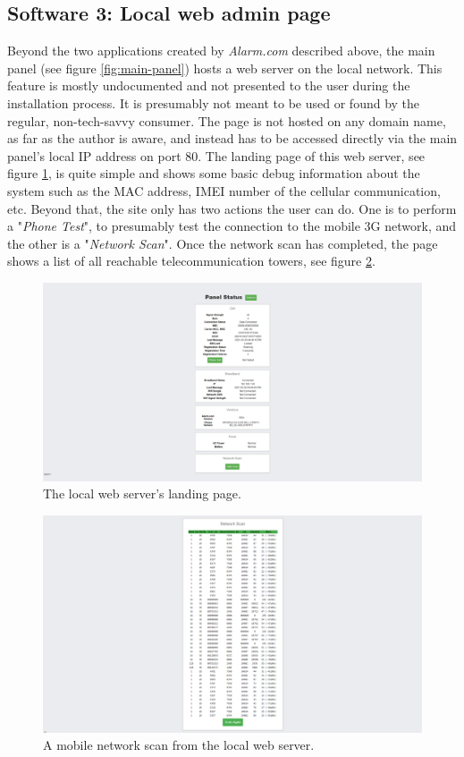 \subsection{Software 3: Local web admin page} \label{ch:system:local-admin}
Beyond the two applications created by \textit{Alarm.com} described above, the main panel (see figure \ref{fig:main-panel}) hosts a web server on the local network. This feature is mostly undocumented and not presented to the user during the installation process. It is presumably not meant to be used or found by the regular, non-tech-savvy consumer. The page is not hosted on any domain name, as far as the author is aware, and instead has to be accessed directly via the main panel's local IP address on port 80. The landing page of this web server, see figure \ref{fig:local-landing-page}, is quite simple and shows some basic debug information about the system such as the MAC address, IMEI number of the cellular communication, etc. Beyond that, the site only has two actions the user can do. One is to perform a "\textit{Phone Test}", to presumably test the connection to the mobile 3G network, and the other is a "\textit{Network Scan}". Once the network scan has completed, the page shows a list of all reachable telecommunication towers, see figure \ref{fig:local-network-scan}.
\begin{figure}[!ht]
    \centering
    \includegraphics[width=\textwidth]{images/3-system/local-landing-page.png}
    \caption{The local web server's landing page.}
    \label{fig:local-landing-page}
\end{figure}
\begin{figure}[!ht]
    \centering
    \includegraphics[width=\textwidth]{images/3-system/local-network-scan.png}
    \caption{A mobile network scan from the local web server.}
    \label{fig:local-network-scan}
\end{figure}

